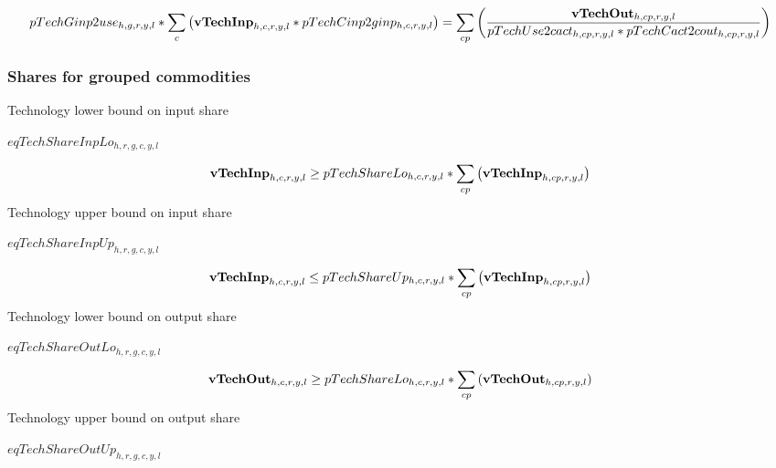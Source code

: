 \documentclass{article}
\begin{document}
\begin{dmath} 
pTechGinp2use_{h,g,r,y,l}*\sum_{c}{\left({\bf vTechInp}_{h,c,r,y,l}*pTechCinp2ginp_{h,c,r,y,l}\right)}  =  \sum_{cp}{\left(\frac{{\bf vTechOut}_{h,cp,r,y,l}}{pTechUse2cact_{h,cp,r,y,l}*pTechCact2cout_{h,cp,r,y,l}}\right)}
\end{dmath} 
\subsubsection*{Shares for grouped commodities}
Technology lower bound on input share







$eqTechShareInpLo_{h,r,g,c,y,l}$





\begin{dmath} 
{\bf vTechInp}_{h,c,r,y,l}  \ge  pTechShareLo_{h,c,r,y,l}*\sum_{cp}{\left({\bf vTechInp}_{h,cp,r,y,l}\right)}
\end{dmath} 
Technology upper bound on input share







$eqTechShareInpUp_{h,r,g,c,y,l}$





\begin{dmath} 
{\bf vTechInp}_{h,c,r,y,l}  \le  pTechShareUp_{h,c,r,y,l}*\sum_{cp}{\left({\bf vTechInp}_{h,cp,r,y,l}\right)}
\end{dmath} 
Technology lower bound on output share







$eqTechShareOutLo_{h,r,g,c,y,l}$





\begin{dmath} 
{\bf vTechOut}_{h,c,r,y,l}  \ge  pTechShareLo_{h,c,r,y,l}*\sum_{cp}{\left({\bf vTechOut}_{h,cp,r,y,l}\right)}
\end{dmath} 
Technology upper bound on output share







$eqTechShareOutUp_{h,r,g,c,y,l}$
\end{document}
